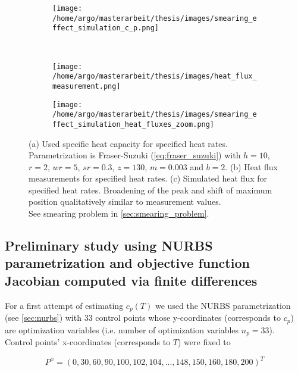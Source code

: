 \documentclass{scrartcl}[12pt, halfparskip]
\numberwithin{equation}{section}
\numberwithin{figure}{section}
\numberwithin{table}{section}
\begin{document}
\begin{figure}[H]
	\centering
	\begin{subfigure}{0.9\textwidth}
		\centering
		\texttt{[image: /home/argo/masterarbeit/thesis/images/smearing\_effect\_simulation\_c\_p.png]}
		\caption{}
		\label{fig:smearing_effect_c_p}
	\end{subfigure} \\
	\begin{subfigure}{0.49\textwidth}
		\texttt{[image: /home/argo/masterarbeit/thesis/images/heat\_flux\_measurement.png]}
		\caption{}
		\label{fig:smearing_effect_measurement_heat_flux}
	\end{subfigure}
	\begin{subfigure}{0.49\textwidth}
		\texttt{[image: /home/argo/masterarbeit/thesis/images/smearing\_effect\_simulation\_heat\_fluxes\_zoom.png]}
		\caption{}
		\label{fig:smearing_effect_simulation_heat_flux}
	\end{subfigure}
	\caption{(a) Used specific heat capacity for specified heat rates. Parametrization is Fraser-Suzuki (\cref{eq:fraser_suzuki}) with $h=10$, $r=2$, $wr=5$, $sr=0.3$, $z=130$, $m=0.003$ and $b=2$. (b) Heat flux measurements for specified heat rates. (c) Simulated heat flux for specified heat rates. Broadening of the peak and shift of maximum position qualitatively similar to measurement values. \\
	See smearing problem in \cref{sec:smearing_problem}.}
\end{figure}



\subsection{Preliminary study using NURBS parametrization and objective function Jacobian computed via finite differences}
\label{sec:param_estim_NURBS}

For a first attempt of estimating $c_p(T)$  we used the NURBS parametrization (see \cref{sec:nurbs}) with 33 control points whose y-coordinates (corresponds to $c_p$) are optimization variables (i.e. number of optimization variables $n_p=33$). Control points' x-coordinates (corresponds to $T$) were fixed to 

\begin{equation}
	P^x = (0, 30, 60, 90, 100, 102, 104, ..., 148, 150, 160, 180, 200)^T
\end{equation}
\end{document}
